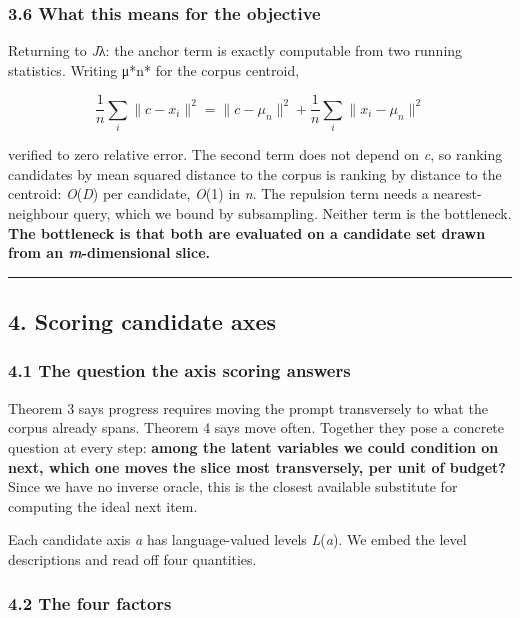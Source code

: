 \documentclass[
  11pt,
]{article}
\theoremstyle{plain}
\theoremstyle{definition}
\begin{document}
\subsubsection{3.6 What this means for the
objective}\label{36-what-this-means-for-the-objective}

Returning to \emph{J}λ: the anchor term is exactly computable from two
running statistics. Writing μ*n* for the corpus centroid,

\[
\frac{1}{n}\sum_i \lVert c - x_i\rVert^2 = \lVert c - \mu_n\rVert^2 + \frac{1}{n}\sum_i \lVert x_i - \mu_n\rVert^2
\]

verified to zero relative error. The second term does not depend on
\emph{c}, so ranking candidates by mean squared distance to the corpus
is ranking by distance to the centroid: \emph{O}(\emph{D}) per
candidate, \emph{O}(1) in \emph{n}. The repulsion term needs a
nearest-neighbour query, which we bound by subsampling. Neither term is
the bottleneck. \textbf{The bottleneck is that both are evaluated on a
candidate set drawn from an \emph{m}-dimensional slice.}

\begin{center}\rule{0.5\linewidth}{0.5pt}\end{center}

\subsection{4. Scoring candidate axes}\label{4-scoring-candidate-axes}

\subsubsection{4.1 The question the axis scoring
answers}\label{41-the-question-the-axis-scoring-answers}

Theorem 3 says progress requires moving the prompt transversely to what
the corpus already spans. Theorem 4 says move often. Together they pose
a concrete question at every step: \textbf{among the latent variables we
could condition on next, which one moves the slice most transversely,
per unit of budget?} Since we have no inverse oracle, this is the
closest available substitute for computing the ideal next item.

Each candidate axis \emph{a} has language-valued levels
\emph{L}(\emph{a}). We embed the level descriptions and read off four
quantities.

\subsubsection{4.2 The four factors}\label{42-the-four-factors}
\end{document}
